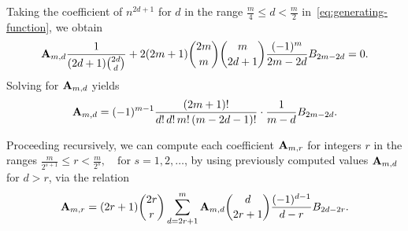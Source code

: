 Taking the coefficient of $n^{2d+1}$ for $d$ in the range $\frac{m}{4} \leq d < \frac{m}{2}$ in~\eqref{eq:generating-function}, we obtain
\begin{align*}
    {\mathbf{A}} \sb{m,d} \frac{1}{(2d+1) \binom{2d}{d}}
    + 2 (2m+1) \binom{2m}{m} \binom{m}{2d+1} \frac{(-1)^m}{2m - 2d} {B}\sb{2m - 2d} = 0.
\end{align*}
Solving for ${\mathbf{A}} \sb{m,d}$ yields
\begin{equation*}
    {\mathbf{A}} \sb{m,d}
    = (-1)^{m-1} \frac{(2m+1)!}{d! \, d! \, m! \, (m - 2d - 1)!} \cdot \frac{1}{m - d} {B}\sb{2m - 2d}.
\end{equation*}

Proceeding recursively, we can compute each coefficient ${\mathbf{A}} \sb{m,r}$ for integers $r$ in the ranges
$\frac{m}{2^{s+1}} \leq r < \frac{m}{2^s}, \quad \text{for } s = 1, 2, \ldots$,
by using previously computed values ${\mathbf{A}} \sb{m,d}$ for $d > r$, via the relation
\begin{equation*}
    {\mathbf{A}} \sb{m,r} =
    (2r+1) \binom{2r}{r} \sum_{d = 2r+1}^{m}
    {\mathbf{A}} \sb{m,d} \binom{d}{2r+1} \frac{(-1)^{d-1}}{d - r} {B}\sb{2d - 2r}.
\end{equation*}

